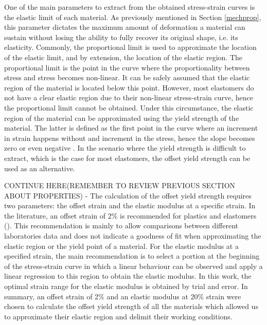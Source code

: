 One of the main parameters to extract from the obtained stress-strain curves is the elastic limit of each material. As previously mentioned in Section \ref{mechprop}, this parameter dictates the maximum amount of deformation a material can sustain without losing the ability to fully recover its original shape, i.e. its elasticity. Commonly, the proportional limit is used to approximate the location of the elastic limit, and by extension, the location of the elastic region. The proportional limit is the point in the curve where the proportionality between stress and stress becomes non-linear. It can be safely assumed that the elastic region of the material is located below this point. However, most elastomers do not have a clear elastic region due to their non-linear stress-strain curve, hence the proportional limit cannot be obtained. Under this circumstance, the elastic region of the material can be approximated using the yield strength of the material. The latter is defined as the first point in the curve where an increment in strain happens without and increment in the stress, hence the slope becomes zero or even negative \cite{astmd638}. In the scenario where the yield strength is difficult to extract, which is the case for most elastomers, the offset yield strength can be used as an alternative.

CONTINUE HERE(REMEMBER TO REVIEW PREVIOUS SECTION ABOUT PROPERTIES) - The calculation of the offset yield strength requires two parameters: the offset strain and the elastic modulus at a specific strain. In the literature, an offset strain of 2\% is recommended for plastics and elastomers (\cite{instron2019}). This recommendation is mainly to allow comparisons between different laboratories data and does not indicate a goodness of fit when approximating the elastic region or the yield point of a material. For the elastic modulus at a specified strain, the main recommendation is to select a portion at the beginning of the stress-strain curve in which a linear behaviour can be observed and apply a linear regression to this region to obtain the elastic modulus. In this work, the optimal strain range for the elastic modulus is obtained by trial and error. In summary, an offset strain of 2\% and an elastic modulus at 20\% strain were chosen to calculate the offset yield strength of all the materials which allowed us to approximate their elastic region and delimit their working conditions. 

